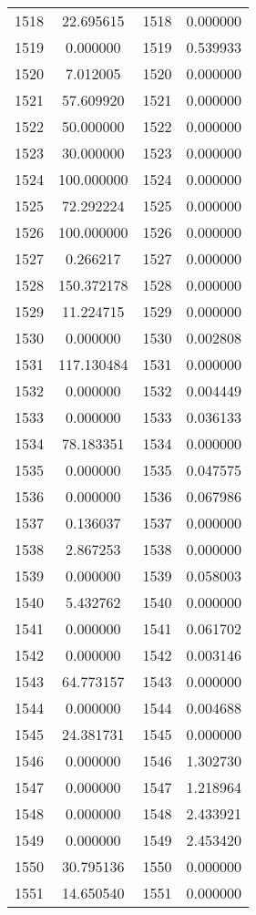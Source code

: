 \documentclass[12pt]{article}
\begin{document}
\begin{longtable}{@{}cccc@{}}
1518 & 22.695615 & 1518 & 0.000000 \\
1519 & 0.000000 & 1519 & 0.539933 \\
1520 & 7.012005 & 1520 & 0.000000 \\
1521 & 57.609920 & 1521 & 0.000000 \\
1522 & 50.000000 & 1522 & 0.000000 \\
1523 & 30.000000 & 1523 & 0.000000 \\
1524 & 100.000000 & 1524 & 0.000000 \\
1525 & 72.292224 & 1525 & 0.000000 \\
1526 & 100.000000 & 1526 & 0.000000 \\
1527 & 0.266217 & 1527 & 0.000000 \\
1528 & 150.372178 & 1528 & 0.000000 \\
1529 & 11.224715 & 1529 & 0.000000 \\
1530 & 0.000000 & 1530 & 0.002808 \\
1531 & 117.130484 & 1531 & 0.000000 \\
1532 & 0.000000 & 1532 & 0.004449 \\
1533 & 0.000000 & 1533 & 0.036133 \\
1534 & 78.183351 & 1534 & 0.000000 \\
1535 & 0.000000 & 1535 & 0.047575 \\
1536 & 0.000000 & 1536 & 0.067986 \\
1537 & 0.136037 & 1537 & 0.000000 \\
1538 & 2.867253 & 1538 & 0.000000 \\
1539 & 0.000000 & 1539 & 0.058003 \\
1540 & 5.432762 & 1540 & 0.000000 \\
1541 & 0.000000 & 1541 & 0.061702 \\
1542 & 0.000000 & 1542 & 0.003146 \\
1543 & 64.773157 & 1543 & 0.000000 \\
1544 & 0.000000 & 1544 & 0.004688 \\
1545 & 24.381731 & 1545 & 0.000000 \\
1546 & 0.000000 & 1546 & 1.302730 \\
1547 & 0.000000 & 1547 & 1.218964 \\
1548 & 0.000000 & 1548 & 2.433921 \\
1549 & 0.000000 & 1549 & 2.453420 \\
1550 & 30.795136 & 1550 & 0.000000 \\
1551 & 14.650540 & 1551 & 0.000000 \\

\end{longtable}
\end{document}
